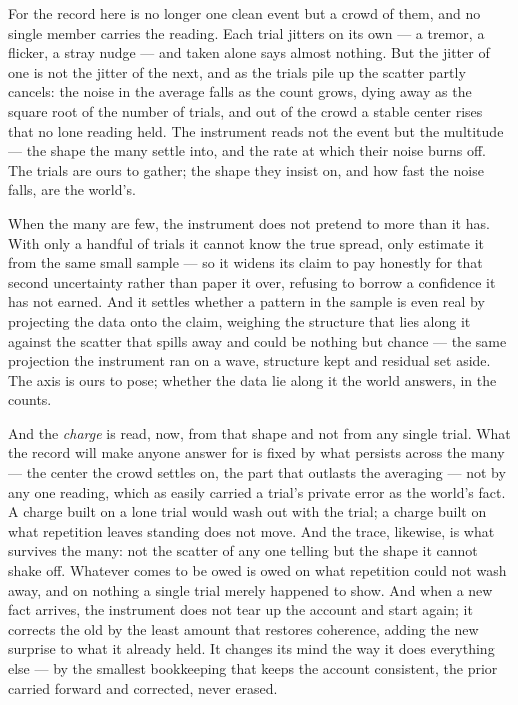 For the record here is no longer one clean event but a crowd of them, and no single member carries the reading.
Each trial jitters on its own --- a tremor, a flicker, a stray nudge --- and taken alone says almost nothing.
But the jitter of one is not the jitter of the next, and as the trials pile up the scatter partly cancels: the
noise in the average falls as the count grows, dying away as the square root of the number of trials, and out
of the crowd a stable center rises that no lone reading held. The instrument reads not the event but the
multitude --- the shape the many settle into, and the rate at which their noise burns off. The trials are ours
to gather; the shape they insist on, and how fast the noise falls, are the world's.

When the many are few, the instrument does not pretend to more than it has. With only a handful of trials it
cannot know the true spread, only estimate it from the same small sample --- so it widens its claim to pay
honestly for that second uncertainty rather than paper it over, refusing to borrow a confidence it has not
earned. And it settles whether a pattern in the sample is even real by projecting the data onto the claim,
weighing the structure that lies along it against the scatter that spills away and could be nothing but chance
--- the same projection the instrument ran on a wave, structure kept and residual set aside. The axis is ours
to pose; whether the data lie along it the world answers, in the counts.

And the \emph{charge} is read, now, from that shape and not from any single trial. What the record will make
anyone answer for is fixed by what persists across the many --- the center the crowd settles on, the part that
outlasts the averaging --- not by any one reading, which as easily carried a trial's private error as the
world's fact. A charge built on a lone trial would wash out with the trial; a charge built on what repetition
leaves standing does not move. And the trace, likewise, is what survives the many: not the scatter of any one
telling but the shape it cannot shake off. Whatever comes to be owed is owed on what repetition could not wash
away, and on nothing a single trial merely happened to show. And when a new fact arrives, the instrument does
not tear up the account and start again; it corrects the old by the least amount that restores coherence, adding
the new surprise to what it already held. It changes its mind the way it does everything else --- by the
smallest bookkeeping that keeps the account consistent, the prior carried forward and corrected, never erased.

